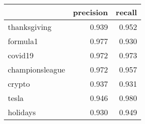 \begin{tabular}{lrr}
\toprule
{} &  precision &  recall \\
\midrule
thanksgiving    &      0.939 &   0.952 \\
formula1        &      0.977 &   0.930 \\
covid19         &      0.972 &   0.973 \\
championsleague &      0.972 &   0.957 \\
crypto          &      0.937 &   0.931 \\
tesla           &      0.946 &   0.980 \\
holidays        &      0.930 &   0.949 \\
\bottomrule
\end{tabular}
